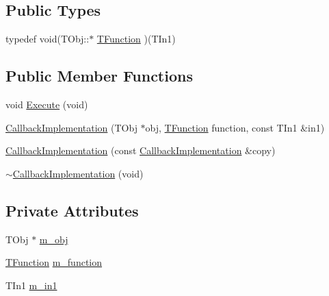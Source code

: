 \subsection*{Public Types}
\begin{DoxyCompactItemize}
\item 
typedef void(T\-Obj\-::$\ast$ \hyperlink{class_callback_implementation_3_01_t_obj_00_01_t_in1_00_01_empty_class_00_01_empty_class_00_01_empty_class_01_4_aa325010e421eadd021d63ed4d542a5fe}{T\-Function} )(T\-In1)
\end{DoxyCompactItemize}
\subsection*{Public Member Functions}
\begin{DoxyCompactItemize}
\item 
void \hyperlink{class_callback_implementation_3_01_t_obj_00_01_t_in1_00_01_empty_class_00_01_empty_class_00_01_empty_class_01_4_a0e1181958cd3723510a30e27cd70e84c}{Execute} (void)
\item 
\hyperlink{class_callback_implementation_3_01_t_obj_00_01_t_in1_00_01_empty_class_00_01_empty_class_00_01_empty_class_01_4_a791b9ba1d91017fa6f30e48a98580c24}{Callback\-Implementation} (T\-Obj $\ast$obj, \hyperlink{class_callback_implementation_3_01_t_obj_00_01_t_in1_00_01_empty_class_00_01_empty_class_00_01_empty_class_01_4_aa325010e421eadd021d63ed4d542a5fe}{T\-Function} function, const T\-In1 \&in1)
\item 
\hyperlink{class_callback_implementation_3_01_t_obj_00_01_t_in1_00_01_empty_class_00_01_empty_class_00_01_empty_class_01_4_ad91c90585817df120129e4fa006a372a}{Callback\-Implementation} (const \hyperlink{class_callback_implementation}{Callback\-Implementation} \&copy)
\item 
\hyperlink{class_callback_implementation_3_01_t_obj_00_01_t_in1_00_01_empty_class_00_01_empty_class_00_01_empty_class_01_4_a6d4ded85c44ff815fbd12f0400e575c8}{$\sim$\-Callback\-Implementation} (void)
\end{DoxyCompactItemize}
\subsection*{Private Attributes}
\begin{DoxyCompactItemize}
\item 
T\-Obj $\ast$ \hyperlink{class_callback_implementation_3_01_t_obj_00_01_t_in1_00_01_empty_class_00_01_empty_class_00_01_empty_class_01_4_a830dcb1573886b5ea7503fd923553059}{m\-\_\-obj}
\item 
\hyperlink{class_callback_implementation_3_01_t_obj_00_01_t_in1_00_01_empty_class_00_01_empty_class_00_01_empty_class_01_4_aa325010e421eadd021d63ed4d542a5fe}{T\-Function} \hyperlink{class_callback_implementation_3_01_t_obj_00_01_t_in1_00_01_empty_class_00_01_empty_class_00_01_empty_class_01_4_ab15e5d7c385ca2c7958e32f43f14b1f3}{m\-\_\-function}
\item 
T\-In1 \hyperlink{class_callback_implementation_3_01_t_obj_00_01_t_in1_00_01_empty_class_00_01_empty_class_00_01_empty_class_01_4_adfb4f5b52516f5c78c02c6bb7288656a}{m\-\_\-in1}
\end{DoxyCompactItemize}



